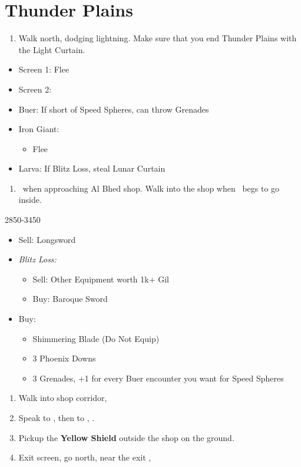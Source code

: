 \chapter{Thunder Plains}

\begin{enumerate}
  \item Walk north, dodging lightning. Make sure that you end Thunder Plains with the Light Curtain.
\end{enumerate}
\begin{encounters}
  \begin{itemize}
    \item Screen 1: Flee
    \item Screen 2:
    \item Buer: If short of Speed Spheres, can throw Grenades
    \item Iron Giant:
          \begin{itemize}
            \rikkuf Steal Light Curtain
            \item Flee
          \end{itemize}
    \item Larva: If Blitz Loss, steal Lunar Curtain
  \end{itemize}
\end{encounters}
\begin{enumerate}[resume]
  \item \sd\ when approaching Al Bhed shop. Walk into the shop when \rikku\ begs to go inside.
\end{enumerate}
\begin{shop}{2850-3450}
  \begin{itemize}
    \item Sell: Longsword
    \item \textit{Blitz Loss:}
          \begin{itemize}
            \item Sell: Other Equipment worth 1k+ Gil
            \item Buy: Baroque Sword
          \end{itemize}
    \item Buy:
          \begin{itemize}
            \item Shimmering Blade (Do Not Equip)
            \item 3 Phoenix Downs
            \item 3 Grenades, +1 for every Buer encounter you want for Speed Spheres
          \end{itemize}
  \end{itemize}
\end{shop}
\begin{enumerate}[resume]
  \item Walk into shop corridor, \cs[2:00]
  \item Speak to \auron, then to \rikku, \sd.
  \item Pickup the \textbf{Yellow Shield} outside the shop on the ground.
  \item Exit screen, go north, near the exit \sd, \cs[3:10]
\end{enumerate}